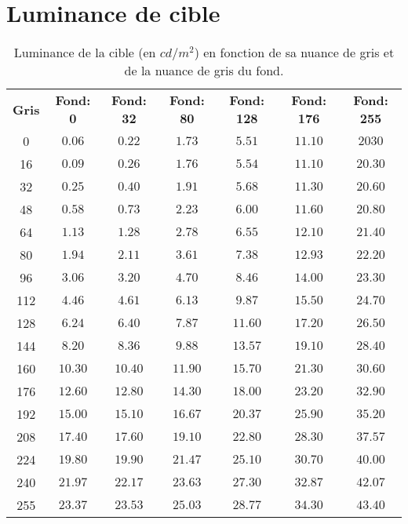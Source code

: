 	\section*{Luminance de cible}
	\begin{table}[h]	
		\centering
		\caption{Luminance de la cible (en $cd/m^2$) en fonction de sa nuance de gris et de la nuance de gris du fond.}
		\label{tab:mesure_luminance_fond}
		\small
		\begin{tabular}{ccccccc}
			\textbf{Gris} & \textbf{Fond: 0} & \textbf{Fond: 32} & \textbf{Fond: 80} & \textbf{Fond: 128} & \textbf{Fond: 176} & \textbf{Fond: 255}\\
			0 & $0.06$ & $0.22$ & $1.73$ & $5.51$ & $11.10$ & $2030$\\
			16 & $0.09$ & $0.26$ & $1.76$ & $5.54$ & $11.10$ & $20.30$\\
			32 & $0.25$ & $0.40$ & $1.91$ & $5.68$ & $11.30$ & $20.60$\\
			48 & $0.58$ & $0.73$ & $2.23$ & $6.00$ & $11.60$ & $20.80$\\
			64 & $1.13$ & $1.28$ & $2.78$ & $6.55$ & $12.10$ & $21.40$\\
			80 & $1.94$ & $2.11$ & $3.61$ & $7.38$ & $12.93$ & $22.20$\\
			96 & $3.06$ & $3.20$ & $4.70$ & $8.46$ & $14.00$ & $23.30$\\
			112 & $4.46$ & $4.61$ & $6.13$ & $9.87$ & $15.50$ & $24.70$\\
			128 & $6.24$ & $6.40$ & $7.87$ & $11.60$ & $17.20$ & $26.50$\\
			144 & $8.20$ & $8.36$ & $9.88$ & $13.57$ & $19.10$ & $28.40$\\
			160 & $10.30$ & $10.40$ & $11.90$ & $15.70$ & $21.30$ & $30.60$\\
			176 & $12.60$ & $12.80$ & $14.30$ & $18.00$ & $23.20$ & $32.90$\\
			192 & $15.00$ & $15.10$ & $16.67$ & $20.37$ & $25.90$ & $35.20$\\
			208 & $17.40$ & $17.60$ & $19.10$ & $22.80$ & $28.30$ & $37.57$\\
			224 & $19.80$ & $19.90$ & $21.47$ & $25.10$ & $30.70$ & $40.00$\\
			240 & $21.97$ & $22.17$ & $23.63$ & $27.30$ & $32.87$ & $42.07$\\
			255 & $23.37$ & $23.53$ & $25.03$ & $28.77$ & $34.30$ & $43.40$\\
		\end{tabular}
	\end{table}
		
%	
